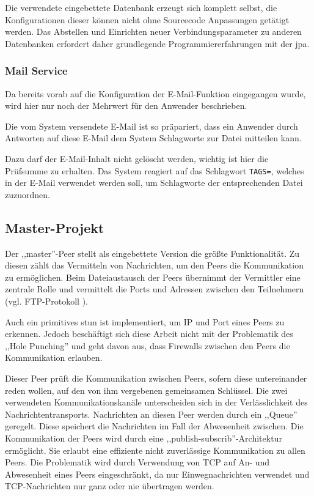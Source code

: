 \documentclass[oneside, ngerman, toc=bibliography,bibliography=totoc,listof=entryprefix, open=right,numbers=noenddot,fontsize=12pt]{scrbook}
\begin{document}
Die verwendete eingebettete Datenbank erzeugt sich komplett selbst, die Konfigurationen dieser können nicht ohne Sourcecode Anpassungen getätigt werden.
Das Abstellen und Einrichten neuer Verbindungsparameter zu anderen Datenbanken erfordert daher grundlegende Programmiererfahrungen mit der \acrshort{jpa}.



\subsubsection{Mail Service}
Da bereits vorab auf die Konfiguration der E-Mail-Funktion eingegangen wurde, wird hier nur noch der Mehrwert für den Anwender beschrieben.

Die vom System versendete E-Mail ist so präpariert, dass ein Anwender durch Antworten auf diese E-Mail dem System Schlagworte zur Datei mitteilen kann.

Dazu darf der E-Mail-Inhalt nicht gelöscht werden, wichtig ist hier die Prüfsumme zu erhalten. Das System reagiert auf das Schlagwort \verb|TAGS=|, welches in der E-Mail verwendet werden soll, um Schlagworte der entsprechenden Datei zuzuordnen.



\subsection{Master-Projekt}

Der ,,master''-Peer stellt als eingebettete Version die größte  Funktionalität. Zu diesen zählt das Vermitteln von Nachrichten, um den Peers die Kommunikation zu ermöglichen. Beim Dateiaustausch der Peers übernimmt der Vermittler eine zentrale Rolle und vermittelt die Ports und Adressen zwischen den Teilnehmern (vgl. FTP-Protokoll \cite{rfc959}).


Auch ein primitives \acrshort{stun} ist implementiert, um IP und Port eines Peers zu erkennen. Jedoch beschäftigt sich diese Arbeit nicht mit der Problematik des ,,Hole Punching'' und geht davon aus, dass Firewalls zwischen den Peers die Kommunikation erlauben.


Dieser Peer prüft die Kommunikation zwischen Peers, sofern diese untereinander reden wollen, auf den von ihm vergebenen gemeinsamen Schlüssel.
Die zwei verwendeten Kommunikationskanäle unterscheiden sich in der Verlässlichkeit des Nachrichtentransports. 
Nachrichten an diesen Peer werden durch ein ,,Queue'' geregelt. Diese speichert die Nachrichten im Fall der Abwesenheit zwischen. Die Kommunikation der Peers wird durch eine ,,publish-subscrib''-Architektur ermöglicht. Sie erlaubt eine effiziente nicht zuverlässige Kommunikation zu allen Peers. Die Problematik wird durch Verwendung von TCP auf An- und Abwesenheit eines Peers eingeschränkt, da nur Einwegnachrichten verwendet und TCP-Nachrichten nur ganz oder nie übertragen werden. 
\end{document}
